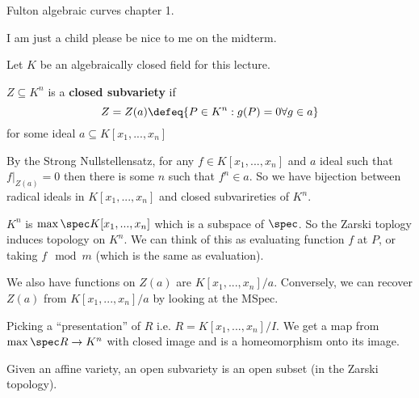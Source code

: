 \section{}
Fulton algebraic curves chapter 1.
\begin{remark}
    I am just a child please be nice to me on the midterm.
\end{remark}

\begin{notation}
    Let $K$ be an algebraically closed field for this lecture.
\end{notation}

{
$Z\subseteq K^n$ is a \textbf{closed subvariety} if \[Z=Z(a)\defeq \{P\in K^n: g(P)=0\forall g\in a\}\] 
 for some ideal $a \subseteq K[x_1,...,x_n]$
}
\begin{remark}
    By the Strong Nullstellensatz, for any $f\in K[x_1,...,x_n]$ and $a$ ideal such that $f|_{Z(a)}=0$ then there is some $n$ such that $f^n\in a$. So we have bijection between radical ideals in $K[x_1,...,x_n]$ and closed subvarireties of $K^n$. 
\end{remark}

$K^n$ is $\max \spec K[x_1,...,x_n]$ which is a subspace of $\spec$. So the Zarski toplogy induces topology on $K^n$. We can think of this as evaluating function $f$ at $P$, or taking $f\mod m$ (which is the same as evaluation).


We also have functions on $Z(a)$ are $K[x_1,...,x_n]/a$. Conversely, we can recover $Z(a)$ from $K[x_1,...,x_n]/a$ by looking at the MSpec. 

\begin{remark}
    Picking a ``presentation'' of $R$ i.e. $R=K[x_1,...,x_n]/I$. We get a map from $\max\spec R \to K^n$ with closed image and is a homeomorphism onto its image. 
\end{remark}

Given an affine variety, an open subvariety is an open subset (in the Zarski topology).


